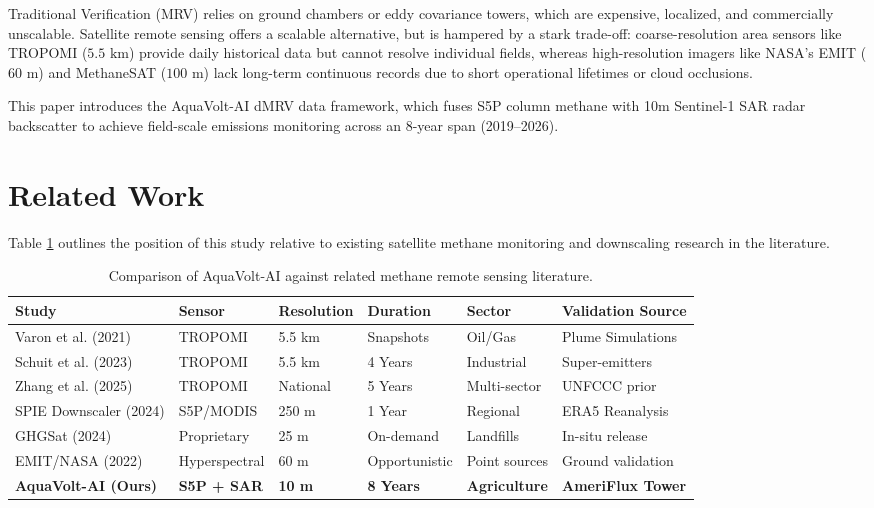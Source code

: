 \documentclass[sn-mathphys,Numbered]{sn-jnl}
\begin{document}
Traditional Verification (MRV) relies on ground chambers or eddy covariance towers, which are expensive, localized, and commercially unscalable. Satellite remote sensing offers a scalable alternative, but is hampered by a stark trade-off: coarse-resolution area sensors like TROPOMI ($5.5\text{~km}$) provide daily historical data but cannot resolve individual fields, whereas high-resolution imagers like NASA's EMIT ($60\text{~m}$) and MethaneSAT ($100\text{~m}$) lack long-term continuous records due to short operational lifetimes or cloud occlusions. 

This paper introduces the AquaVolt-AI dMRV data framework, which fuses S5P column methane with 10m Sentinel-1 SAR radar backscatter to achieve field-scale emissions monitoring across an 8-year span (2019--2026).

\section{Related Work}\label{sec:related}
Table \ref{tab:related_work} outlines the position of this study relative to existing satellite methane monitoring and downscaling research in the literature.

\begin{table}[h]
\begin{center}
\caption{Comparison of AquaVolt-AI against related methane remote sensing literature.}\label{tab:related_work}
\begin{tabular}{@{}llllll@{}}
\toprule
Study & Sensor & Resolution & Duration & Sector & Validation Source \\
\midrule
Varon et al. (2021) & TROPOMI & 5.5 km & Snapshots & Oil/Gas & Plume Simulations \\
Schuit et al. (2023) & TROPOMI & 5.5 km & 4 Years & Industrial & Super-emitters \\
Zhang et al. (2025) & TROPOMI & National & 5 Years & Multi-sector & UNFCCC prior \\
SPIE Downscaler (2024) & S5P/MODIS & 250 m & 1 Year & Regional & ERA5 Reanalysis \\
GHGSat (2024) & Proprietary & 25 m & On-demand & Landfills & In-situ release \\
EMIT/NASA (2022) & Hyperspectral & 60 m & Opportunistic & Point sources & Ground validation \\
\textbf{AquaVolt-AI (Ours)} & \textbf{S5P + SAR} & \textbf{10 m} & \textbf{8 Years} & \textbf{Agriculture} & \textbf{AmeriFlux Tower} \\
\bottomrule
\end{tabular}
\end{center}
\end{table}
\end{document}
